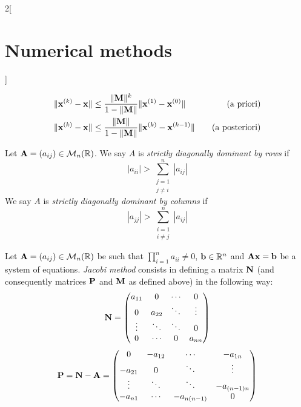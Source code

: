 \documentclass[../../../main.tex]{subfiles}
\begin{document}
\begin{multicols}{2}[\section{Numerical methods}]
\begin{prop}
    \begin{align*}
        \|\vb{x}^{(k)}-\vb{x}\|&\leq\frac{\|\vb{M}\|^k}{1-\|\vb{M}\|}\|\vb{x}^{(1)}-\vb{x}^{(0)}\|\quad&\text{(a priori)}\\
        \|\vb{x}^{(k)}-\vb{x}\|&\leq\frac{\|\vb{M}\|}{1-\|\vb{M}\|}\|\vb{x}^{(k)}-\vb{x}^{(k-1)}\|\quad&\text{(a posteriori)}
    \end{align*}
\end{prop}
\begin{definition}
    Let $\vb{A}=(a_{ij})\in\mathcal{M}_n(\mathbb{R})$. We say $A$ is \textit{strictly diagonally dominant by rows} if $$|a_{ii}|>\sum_{\substack{j=1\\j\ne i}}^n|a_{ij}|$$
    We say $A$ is \textit{strictly diagonally dominant by columns} if $$|a_{jj}|>\sum_{\substack{i=1\\i\ne j}}^n|a_{ij}|$$
\end{definition}
\begin{definition}
    Let $\vb{A}=(a_{ij})\in\mathcal{M}_n(\mathbb{R})$ be such that $\prod_{i=1}^na_{ii}\ne 0$, $\vb{b}\in\mathbb{R}^n$ and $\vb{A}\vb{x}=\vb{b}$ be a system of equations. \textit{Jacobi method} consists in defining a matrix $\vb{N}$ (and consequently matrices $\vb{P}$ and $\vb{M}$ as defined above) in the following way:
    \begin{equation*}
        \vb{N}=
        \begin{pmatrix}
            a_{11} & 0 & \cdots & 0\\
            0 & a_{22} & \ddots & \vdots\\
            \vdots & \ddots & \ddots & 0\\
            0 & \cdots & 0 & a_{nn}
        \end{pmatrix}
    \end{equation*}
    \begin{equation*}
        \vb{P}=\vb{N}-\vb{A}=
        \begin{pmatrix}
            0 & -a_{12} & \cdots & -a_{1n}\\
            -a_{21} & 0 & \ddots & \vdots\\
            \vdots & \ddots & \ddots & -a_{(n-1)n}\\
            -a_{n1} & \cdots & -a_{n(n-1)} & 0
        \end{pmatrix}
    \end{equation*}

\end{definition}
\end{multicols}
\end{document}
